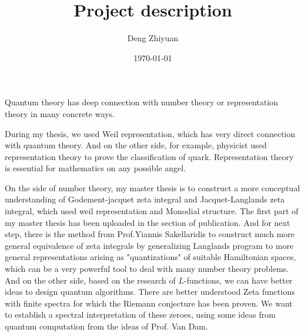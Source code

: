 \documentclass[12pt,a4paper,english]{article}
\title{Project description}
\author{Deng Zhiyuan}
\date{\today}
\theoremstyle{plain}
\theoremstyle{definition}
\begin{document}
\maketitle

Quantum theory has deep connection with number theory or representation theory in many concrete ways.

During my thesis, we used Weil representation, which has very direct connection with quantum theory. And on the other side, for example, physicist used representation theory to prove the classification of quark. Representation theory is essential for mathematics on any possible angel. 

On the side of number theory, my master thesis is to construct a more conceptual understanding of Godement-jacquet zeta integral and Jacquet-Langlands zeta integral, which used weil representation and Monodial structure. The first part of my master thesis has been uploaded in the section of publication. And for next step, there is the method from Prof.Yiannis Sakellaridis to construct much more general equivalence of zeta integrals by generalizing Langlands program to more general representations arising as "quantizations" of suitable Hamiltonian spaces, which can be a very powerful tool to deal with many number theory problems. And on the other side, based on the research of $L$-functions, we can have better ideas to design quantum algorithms. There are better understood Zeta functions
with finite spectra for which the Riemann
conjecture has been proven. We want to establish a spectral
interpretation of these zeroes, using some
ideas from quantum computation from the ideas of Prof. Van Dam.
\end{document}
